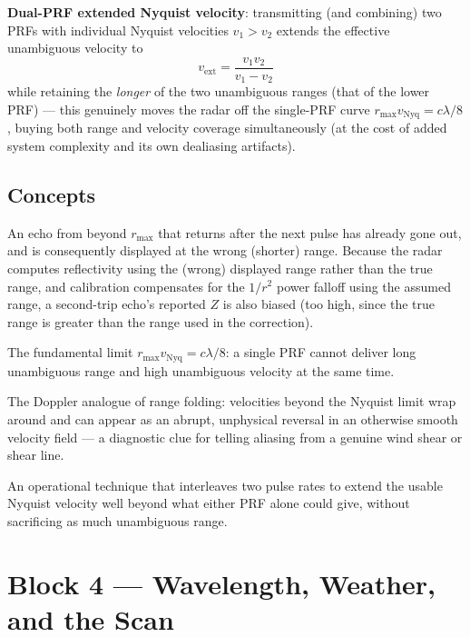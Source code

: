 \documentclass[11pt]{article}
\begin{document}
\textbf{Dual-PRF extended Nyquist velocity}: transmitting (and combining) two PRFs with individual Nyquist velocities $v_1>v_2$ extends the effective unambiguous velocity to
\begin{equation}
v_{\mathrm{ext}} = \frac{v_1 v_2}{v_1 - v_2}
\end{equation}
while retaining the \emph{longer} of the two unambiguous ranges (that of the lower PRF) --- this genuinely moves the radar off the single-PRF curve $r_{\max}v_{\mathrm{Nyq}}=c\lambda/8$, buying both range and velocity coverage simultaneously (at the cost of added system complexity and its own dealiasing artifacts).

\subsection{Concepts}
\begin{description}[leftmargin=1.6cm,style=nextline]
\item[Second-trip echo] An echo from beyond $r_{\max}$ that returns after the next pulse has already gone out, and is consequently displayed at the wrong (shorter) range. Because the radar computes reflectivity using the (wrong) displayed range rather than the true range, and calibration compensates for the $1/r^2$ power falloff using the assumed range, a second-trip echo's reported $Z$ is also biased (too high, since the true range is greater than the range used in the correction).
\item[Range--velocity trade / Doppler dilemma] The fundamental limit $r_{\max}v_{\mathrm{Nyq}}=c\lambda/8$: a single PRF cannot deliver long unambiguous range and high unambiguous velocity at the same time.
\item[Velocity aliasing] The Doppler analogue of range folding: velocities beyond the Nyquist limit wrap around and can appear as an abrupt, unphysical reversal in an otherwise smooth velocity field --- a diagnostic clue for telling aliasing from a genuine wind shear or shear line.
\item[Dual-PRF] An operational technique that interleaves two pulse rates to extend the usable Nyquist velocity well beyond what either PRF alone could give, without sacrificing as much unambiguous range.
\end{description}

\section{Block 4 --- Wavelength, Weather, and the Scan}
\end{document}
